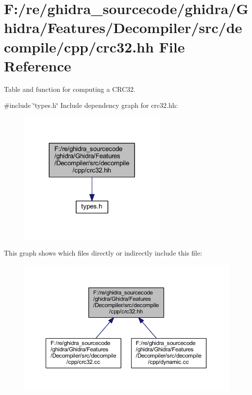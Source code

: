 \hypertarget{crc32_8hh}{}\section{F\+:/re/ghidra\+\_\+sourcecode/ghidra/\+Ghidra/\+Features/\+Decompiler/src/decompile/cpp/crc32.hh File Reference}
\label{crc32_8hh}


Table and function for computing a C\+R\+C32.  


{\ttfamily \#include \char`\"{}types.\+h\char`\"{}}\newline
Include dependency graph for crc32.\+hh\+:
\nopagebreak
\begin{figure}[H]
\begin{center}
\leavevmode
\includegraphics[width=212pt]{crc32_8hh__incl}
\end{center}
\end{figure}
This graph shows which files directly or indirectly include this file\+:
\nopagebreak
\begin{figure}[H]
\begin{center}
\leavevmode
\includegraphics[width=350pt]{crc32_8hh__dep__incl}
\end{center}
\end{figure}
